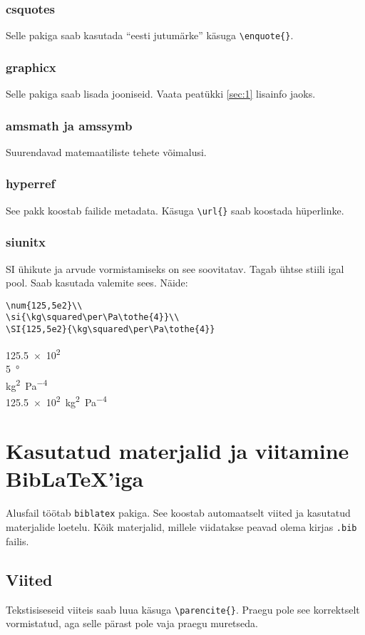 \documentclass{trkut}%
\begin{document}
\subsection{\textsf{csquotes}}
Selle pakiga saab kasutada \enquote{eesti jutumärke} käsuga \verb!\enquote{}!.
\subsection{\textsf{graphicx}}
Selle pakiga saab lisada jooniseid. Vaata peatükki \ref{sec:1} lisainfo jaoks.
\subsection{\textsf{amsmath} ja \textsf{amssymb}}
Suurendavad matemaatiliste tehete võimalusi.
\subsection{\textsf{hyperref}}
See pakk koostab  failide metadata. Käsuga \verb!\url{}! saab koostada hüperlinke.
\subsection{\textsf{siunitx}}
SI ühikute ja arvude vormistamiseks on see soovitatav. Tagab ühtse stiili igal pool. Saab kasutada valemite sees. Näide:
\begin{verbatim}
\num{125,5e2}\\
\si{\kg\squared\per\Pa\tothe{4}}\\
\SI{125,5e2}{\kg\squared\per\Pa\tothe{4}}
\end{verbatim}
\num{125,5e2}\\
\SI{5}{\degree}\\
\si{\kg\squared\per\Pa\tothe{4}}\\
\SI{125,5e2}{\kg\squared\per\Pa\tothe{4}}


\chapter{Kasutatud materjalid ja viitamine BibLaTeX'iga}
Alusfail töötab \verb!biblatex! pakiga. See koostab automaatselt viited ja kasutatud materjalide loetelu. Kõik materjalid, millele viidatakse peavad olema kirjas \verb!.bib! failis.

\section{Viited}
Tekstisiseseid viiteis saab luua käsuga \verb!\parencite{}!. Praegu pole see korrektselt vormistatud, aga selle pärast pole vaja praegu muretseda. \parencite{palma15}
\end{document}
